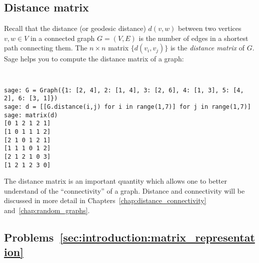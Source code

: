 
\subsection{Distance matrix}

Recall that the distance (or geodesic distance) $d(v,w)$ between two
vertices $v,w \in V$ in a connected graph $G = (V,E)$ is the number of
edges in a shortest path connecting them. The $n \times n$ matrix
$\{ d(v_i, v_j) \}$ is the \emph{distance matrix} of $G$.
Sage helps you to compute the distance matrix of a graph:
%
\begin{center}
\fontsize{9pt}{9pt}
\selectfont
\tt
\begin{lstlisting}
sage: G = Graph({1: [2, 4], 2: [1, 4], 3: [2, 6], 4: [1, 3], 5: [4, 2], 6: [3, 1]})
sage: d = [[G.distance(i,j) for i in range(1,7)] for j in range(1,7)]
sage: matrix(d)
[0 1 2 1 2 1]
[1 0 1 1 1 2]
[2 1 0 1 2 1]
[1 1 1 0 1 2]
[2 1 2 1 0 3]
[1 2 1 2 3 0]
\end{lstlisting}
\end{center}

The distance matrix is an important quantity which allows one to
better understand of the ``connectivity'' of a graph. Distance and
connectivity will be discussed in more detail in
Chapters~\ref{chap:distance_connectivity}
and~\ref{chap:random_graphs}.



\subsection*{Problems~\ref{sec:introduction:matrix_representation}}

